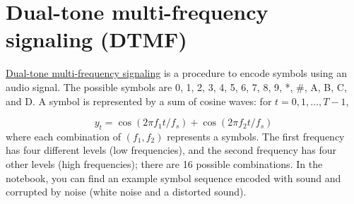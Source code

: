\documentclass[11pt]{article}
\begin{document}
\newpage
\section{Dual-tone multi-frequency signaling (DTMF)}

\href{https://en.wikipedia.org/wiki/Dual-tone\_multi-frequency\_signaling}{Dual-tone multi-frequency signaling} is a procedure to encode symbols using an audio signal.
The possible symbols are 0, 1, 2, 3, 4, 5, 6, 7, 8, 9, *, \#, A, B, C, and D.
A symbol is represented by a sum of cosine waves: for $t=0,1,\dots, T-1$,

$$
y_t = \cos(2\pi f_1 t/f_s) + \cos(2\pi f_2 t/f_s)
$$
where each combination of $(f_1, f_2)$ represents a symbols.
The first frequency has four different levels (low frequencies), and the second frequency has four other levels (high frequencies); there are 16 possible combinations.
In the notebook, you can find an example symbol sequence encoded with sound and corrupted by noise (white noise and a distorted sound).
\end{document}

